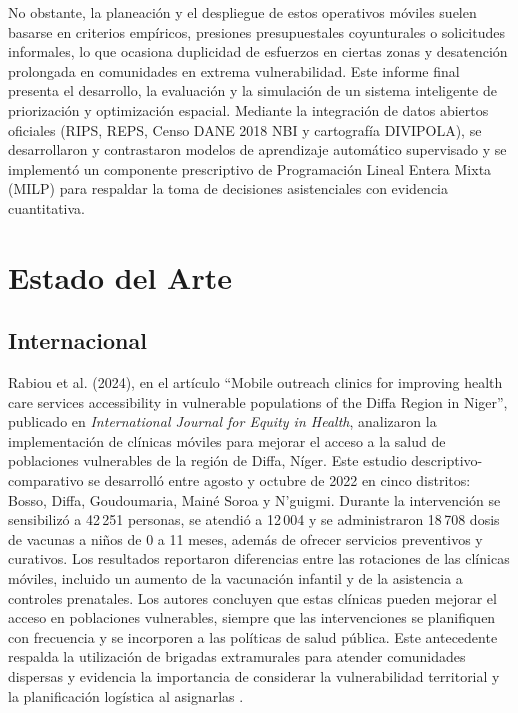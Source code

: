 \documentclass[12pt]{article}
\begin{document}
No obstante, la planeación y el despliegue de estos operativos móviles suelen basarse en criterios empíricos, presiones presupuestales coyunturales o solicitudes informales, lo que ocasiona duplicidad de esfuerzos en ciertas zonas y desatención prolongada en comunidades en extrema vulnerabilidad. Este informe final presenta el desarrollo, la evaluación y la simulación de un sistema inteligente de priorización y optimización espacial. Mediante la integración de datos abiertos oficiales (RIPS, REPS, Censo DANE 2018 NBI y cartografía DIVIPOLA), se desarrollaron y contrastaron modelos de aprendizaje automático supervisado y se implementó un componente prescriptivo de Programación Lineal Entera Mixta (MILP) para respaldar la toma de decisiones asistenciales con evidencia cuantitativa.

\section{Estado del Arte}

\subsection{Internacional}
Rabiou et al. (2024), en el artículo ``Mobile outreach clinics for improving health care services accessibility in vulnerable populations of the Diffa Region in Niger'', publicado en \textit{International Journal for Equity in Health}, analizaron la implementación de clínicas móviles para mejorar el acceso a la salud de poblaciones vulnerables de la región de Diffa, Níger. Este estudio descriptivo-comparativo se desarrolló entre agosto y octubre de 2022 en cinco distritos: Bosso, Diffa, Goudoumaria, Mainé Soroa y N’guigmi. Durante la intervención se sensibilizó a 42\,251 personas, se atendió a 12\,004 y se administraron 18\,708 dosis de vacunas a niños de 0 a 11 meses, además de ofrecer servicios preventivos y curativos. Los resultados reportaron diferencias entre las rotaciones de las clínicas móviles, incluido un aumento de la vacunación infantil y de la asistencia a controles prenatales. Los autores concluyen que estas clínicas pueden mejorar el acceso en poblaciones vulnerables, siempre que las intervenciones se planifiquen con frecuencia y se incorporen a las políticas de salud pública. Este antecedente respalda la utilización de brigadas extramurales para atender comunidades dispersas y evidencia la importancia de considerar la vulnerabilidad territorial y la planificación logística al asignarlas \cite{ref8}.
\end{document}
